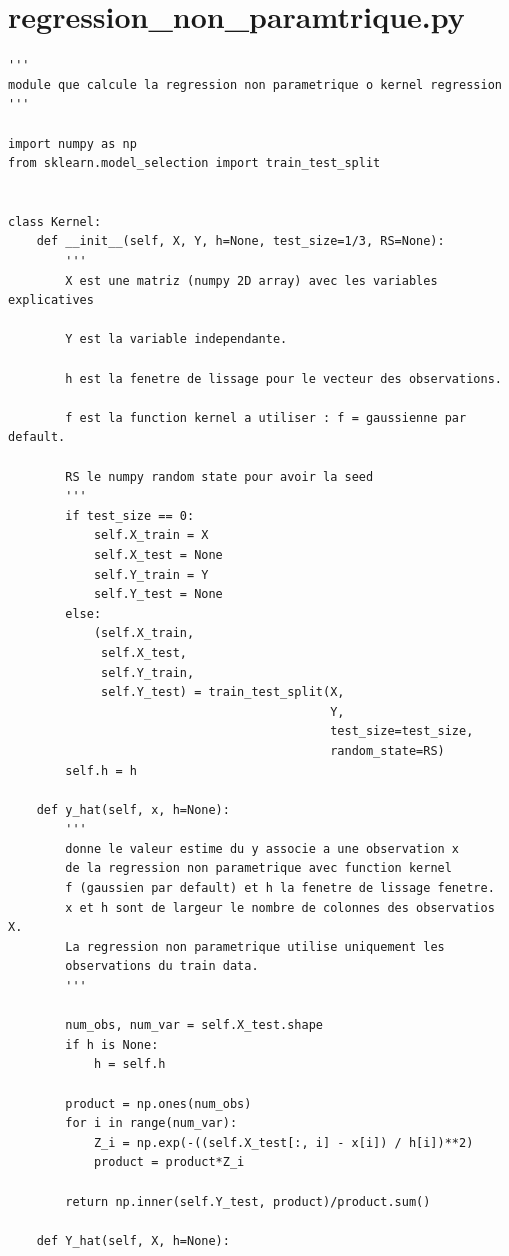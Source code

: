 \documentclass[12pt, a4paper]{book}
\begin{document}
{\section{regression\_non\_paramtrique.py}
\label{non_parametric_regression.py}
\begin{small}
\begin{verbatim}
'''
module que calcule la regression non parametrique o kernel regression
'''

import numpy as np
from sklearn.model_selection import train_test_split


class Kernel:
    def __init__(self, X, Y, h=None, test_size=1/3, RS=None):
        '''
        X est une matriz (numpy 2D array) avec les variables explicatives

        Y est la variable independante.

        h est la fenetre de lissage pour le vecteur des observations.

        f est la function kernel a utiliser : f = gaussienne par default.

        RS le numpy random state pour avoir la seed
        '''
        if test_size == 0:
            self.X_train = X
            self.X_test = None
            self.Y_train = Y
            self.Y_test = None
        else:
            (self.X_train,
             self.X_test,
             self.Y_train,
             self.Y_test) = train_test_split(X,
                                             Y,
                                             test_size=test_size,
                                             random_state=RS)
        self.h = h

    def y_hat(self, x, h=None):
        '''
        donne le valeur estime du y associe a une observation x
        de la regression non parametrique avec function kernel
        f (gaussien par default) et h la fenetre de lissage fenetre.
        x et h sont de largeur le nombre de colonnes des observatios X.
        La regression non parametrique utilise uniquement les
        observations du train data.
        '''

        num_obs, num_var = self.X_test.shape
        if h is None:
            h = self.h

        product = np.ones(num_obs)
        for i in range(num_var):
            Z_i = np.exp(-((self.X_test[:, i] - x[i]) / h[i])**2)
            product = product*Z_i

        return np.inner(self.Y_test, product)/product.sum()

    def Y_hat(self, X, h=None):


\end{verbatim}
\end{small}}
\end{document}
